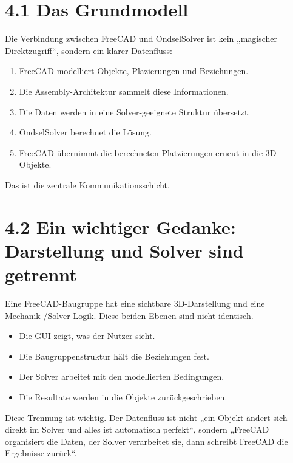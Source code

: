 \documentclass[
  12pt
]{book}
\providecommand{\tightlist}{%
  \setlength{\itemsep}{0pt}\setlength{\parskip}{0pt}}
\begin{document}
\hypertarget{das-grundmodell}{%
\section{\texorpdfstring{{4.1} Das
Grundmodell}{4.1 Das Grundmodell}}\label{das-grundmodell}}

Die Verbindung zwischen FreeCAD und OndselSolver ist kein „magischer
Direktzugriff``, sondern ein klarer Datenfluss:

\begin{enumerate}
\def\labelenumi{\arabic{enumi}.}
\tightlist
\item
  FreeCAD modelliert Objekte, Plazierungen und Beziehungen.
\item
  Die Assembly-Architektur sammelt diese Informationen.
\item
  Die Daten werden in eine Solver-geeignete Struktur übersetzt.
\item
  OndselSolver berechnet die Lösung.
\item
  FreeCAD übernimmt die berechneten Platzierungen erneut in die
  3D-Objekte.
\end{enumerate}

Das ist die zentrale Kommunikationsschicht.

\hypertarget{ein-wichtiger-gedanke-darstellung-und-solver-sind-getrennt}{%
\section{\texorpdfstring{{4.2} Ein wichtiger Gedanke: Darstellung und
Solver sind
getrennt}{4.2 Ein wichtiger Gedanke: Darstellung und Solver sind getrennt}}\label{ein-wichtiger-gedanke-darstellung-und-solver-sind-getrennt}}

Eine FreeCAD-Baugruppe hat eine sichtbare 3D-Darstellung und eine
Mechanik-/Solver-Logik. Diese beiden Ebenen sind nicht identisch.

\begin{itemize}
\tightlist
\item
  Die GUI zeigt, was der Nutzer sieht.
\item
  Die Baugruppenstruktur hält die Beziehungen fest.
\item
  Der Solver arbeitet mit den modellierten Bedingungen.
\item
  Die Resultate werden in die Objekte zurückgeschrieben.
\end{itemize}

Diese Trennung ist wichtig. Der Datenfluss ist nicht „ein Objekt ändert
sich direkt im Solver und alles ist automatisch perfekt``, sondern
„FreeCAD organisiert die Daten, der Solver verarbeitet sie, dann
schreibt FreeCAD die Ergebnisse zurück``.
\end{document}
